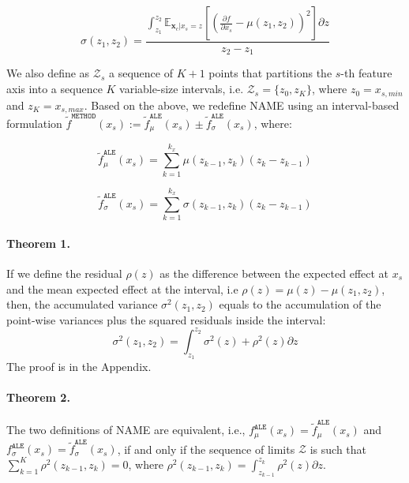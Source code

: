 \documentclass[twoside]{article}
\newcommand{\xc}{\mathbf{x}_c}
\begin{document}
\noindent

\begin{equation}
  \label{eq:var_bin}
  \sigma(z_1, z_2) = \frac{\int_{z_1}^{z_2}
  \mathbb{E}_{\xc|x_s=z} \left [ (\frac{\partial
      f}{\partial x_s} - \mu(z_1, z_2) )^2 \right] \partial z}{z_2 - z_1}
\end{equation}

%
We also define as \(\mathcal{Z}_s\) a sequence of \(K+1\) points that
partitions the \(s\)-th feature axis into a sequence \(K\)
variable-size intervals, i.e. \(\mathcal{Z}_s = \{z_0, z_K\}\), where
\(z_0=x_{s,min}\) and \(z_K=x_{s,max}\). Based on the above, we
redefine NAME using an interval-based formulation
\(\tilde{f}^{\mathtt{METHOD}}(x_s):=
\tilde{f}^{\mathtt{ALE}}_{\mu}(x_s) \pm \tilde{f}^{\mathtt{ALE}}_{\sigma}(x_s)\), where:

\begin{equation}
  \label{eq:ALE_2}
  \tilde{f}^{\mathtt{ALE}}_{\mu}(x_s) = \sum_{k=1}^{k_x} \mu(z_{k-1}, z_k) (z_k - z_{k-1})
\end{equation}

\begin{equation}
  \label{eq:ALE_accumulated_var}
  \tilde{f}^{\mathtt{ALE}}_{\sigma}(x_s) =  \sum_{k=1}^{k_x} \sigma(z_{k-1}, z_k) (z_k - z_{k-1})
\end{equation}
%
\paragraph{Theorem 1.}
\label{sec:theorem-1}

If we define the residual \(\rho(z)\) as the
difference between the expected effect at \(x_s\) and the mean
expected effect at the interval, i.e
\(\rho(z) = \mu(z) - \mu(z_1, z_2)\), then, the accumulated variance
\(\sigma^2(z_1, z_2)\) equals to the accumulation of the point-wise
variances plus the squared residuals inside the interval:
\begin{equation}
 \sigma^2(z_1, z_2) = \int_{z_1}^{z_2} \sigma^2(z) + \rho^2(z) \partial z
\end{equation}
%
The proof is in the Appendix.

\paragraph{Theorem 2.}
\label{sec:theorem-2}

The two definitions of NAME are equivalent, i.e.,
\(f^{\mathtt{ALE}}_{\mu}(x_s) = \tilde{f}^{\mathtt{ALE}}_{\mu}(x_s)\)
and
\(f^{\mathtt{ALE}}_{\sigma}(x_s) =
\tilde{f}^{\mathtt{ALE}}_{\sigma}(x_s)\), if and only if the sequence
of limits \(\mathcal{Z}\) is such that
\(\sum_{k=1}^K \rho^2(z_{k-1}, z_{k}) = 0\), where \(\rho^2(z_{k-1}, z_{k}) = \int_{z_{k-1}}^{z_k} \rho^2(z)\partial z\).
\end{document}
